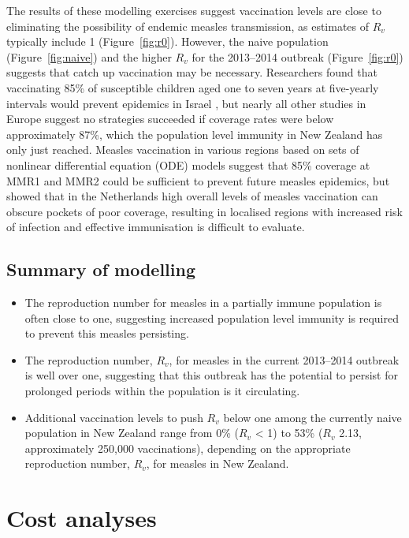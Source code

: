\documentclass{article}
\begin{document}
The results of these modelling exercises suggest vaccination levels are close to eliminating the possibility of endemic measles transmission, as estimates of $R_v$ typically include 1 (Figure~\ref{fig:r0}). However, the naive population (Figure~\ref{fig:naive}) and the higher $R_v$ for the 2013--2014 outbreak (Figure~\ref{fig:r0}) suggests that catch up vaccination may be necessary. Researchers found that vaccinating 85\% of susceptible children aged one to seven years at five-yearly intervals would prevent epidemics in Israel \citep{agur93}, but nearly all other studies in Europe suggest no strategies succeeded if coverage rates were below approximately 87\%, which the population level immunity in New Zealand has only just reached. Measles vaccination in various regions \citep{agur93, babad95, edmunds0, gay98, wallinga1} based on sets of nonlinear differential equation (ODE) models suggest that 85\% coverage at MMR1 and MMR2 could be sufficient to prevent future measles epidemics, but \citep{glass4} showed that in the Netherlands high overall levels of measles vaccination can obscure pockets of poor coverage, resulting in localised regions with increased risk of infection and effective immunisation is difficult to evaluate.

\subsection{Summary of modelling}
\begin{itemize}
\item The reproduction number for measles in a partially immune population is often close to one, suggesting increased population level immunity is required to prevent this measles persisting.
 \item The reproduction number, $R_v$, for measles in the current 2013--2014 outbreak is well over one, suggesting that this outbreak has the potential to persist for prolonged periods within the population is it circulating.
 \item Additional vaccination levels to push $R_v$ below one among the currently naive population in New Zealand range from 0\% ($R_v$ < 1) to 53\% ($R_v$ 2.13, approximately 250,000 vaccinations), depending on the appropriate reproduction number, $R_v$, for measles in New Zealand.
\end{itemize}

\section{Cost analyses}
\end{document}
